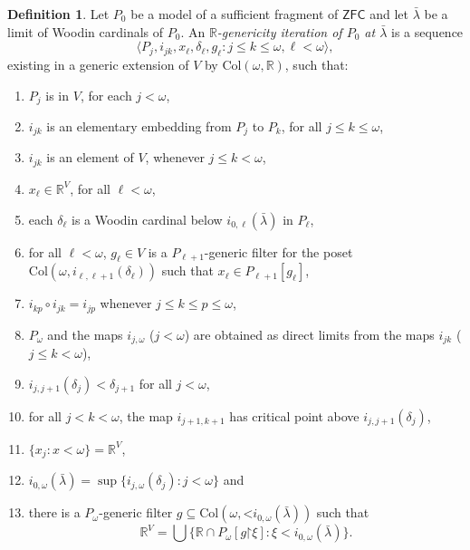 \documentclass[fleqn, 11pt]{amsart}
\theoremstyle{plain}
\theoremstyle{definition}
\newtheorem{defn}[thm]{Definition} \newtheorem*{defn*}{Definition}
\theoremstyle{remark}
\newcommand{\bbR}{\mathbb{R}}
\newcommand{\ZFC}{\mathsf{ZFC}}
\newcommand{\Col}{\mathrm{Col}}
\newcommand{\restrict}{\mathord{\restriction}}
\begin{document}
\begin{defn}\label{defn-R-gen-iter}
 Let $P_0$ be a model of a sufficient fragment of $\ZFC$
and let $\bar{\lambda}$ be a limit of Woodin cardinals of $P_0$.
 An \emph{$\mathbb{R}$-genericity iteration of $P_0$ at $\bar{\lambda}$} is a sequence
 \[\langle P_{j}, i_{jk}, x_{\ell}, \delta_{\ell}, g_{\ell} : j \leq k \leq \omega, \ell < \omega \rangle,\] existing in a generic extension of $V$ by $\Col(\omega,\mathbb{R})$, such that:
 \begin{enumerate}
  \item $P_j$ is in $V$, for each $j < \omega$,
  \item $i_{jk}$ is an elementary embedding from $P_j$ to $P_k$, for all $j \leq k \leq \omega$, 
  \item $i_{jk}$ is an element of $V$, whenever $j \leq k < \omega$,
  \item $x_\ell \in \bbR^{V}$, for all $\ell < \omega$,
  \item each $\delta_{\ell}$ is a Woodin cardinal below  $i_{0,\ell}(\bar{\lambda})$ in $P_{\ell}$,
  \item\label{genitem} for all $\ell < \omega$, $g_{\ell} \in V$ is a $P_{\ell+1}$-generic filter for the poset $\Col(\omega,i_{\ell,\ell+1}(\delta_\ell))$ such that $x_\ell \in P_{\ell+1}[g_{\ell}]$, 
  \item $i_{kp} \circ i_{jk} = i_{jp}$ whenever $j \le k \le p \le \omega$,
  \item $P_\omega$ and the maps $i_{j,\omega}$ ($j < \omega$) are obtained as direct limits from the maps $i_{jk}$ ($j \leq k < \omega$),
  \item $i_{j,j+1}(\delta_j) < \delta_{j+1}$ for all $j < \omega$, 
  \item\label{soitextem} for all $j < k <  \omega$, the map $i_{j+1,k+1}$ has critical point above $i_{j,j+1}(\delta_j)$,
  \item $\{x_j : x < \omega\} = \mathbb{R}^V$,
  \item $i_{0,\omega}(\bar{\lambda}) = \sup\{i_{j,\omega}(\delta_j) : j < \omega\}$ and
  \item\label{pomegasymmtem} there is a $P_\omega$-generic filter $g \subseteq \Col(\omega,\mathord{<}i_{0,\omega}(\bar{\lambda}))$ such that \[\mathbb{R}^V = \bigcup\{ \bbR \cap P_{\omega}[g \restrict \xi] : \xi < i_{0,\omega}(\bar{\lambda})\}.\]
  
 \end{enumerate}
\end{defn}
\end{document}

